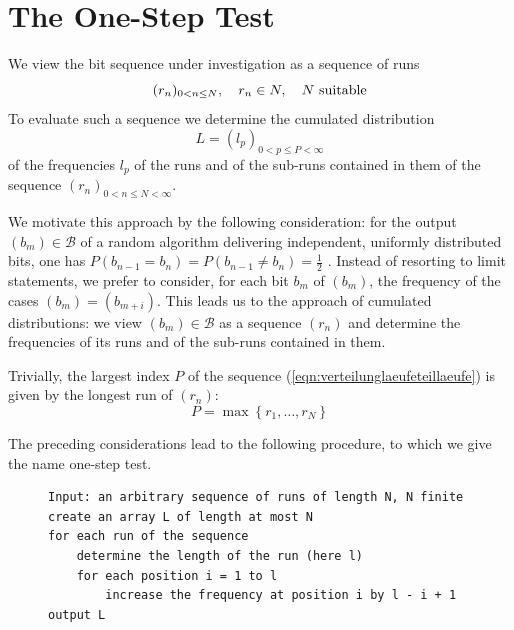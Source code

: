 \documentclass[11pt,a4paper]{scrartcl}
\theoremstyle{plain}
\theoremstyle{definition}
\theoremstyle{remark}
\begin{document}
\section{The One-Step Test}\label{sec:einschritttest}

We view the bit sequence under investigation as a sequence of runs
\begin{equation}\label{eqn:laeuflangefolge}
  (r_n)_{0<n\leq N},\quad r_n\in\mathcal \mathbb N,\quad N\text{ suitable}
\end{equation}
To evaluate such a sequence we determine the cumulated distribution
\begin{equation}\label{eqn:verteilunglaeufeteillaeufe}
  L=(l_p)_{0<p\leq P<\infty}
\end{equation}
of the frequencies $l_p$ of the runs and of the sub-runs contained in
them of the sequence $(r_n)_{0<n\leq N<\infty}$.

We motivate this approach by the following consideration: for the
output $(b_m)\in \mathcal B$ of a random algorithm delivering
independent, uniformly distributed bits, one has
$P(b_{n-1}=b_n)=P(b_{n-1}\neq b_n)=\tfrac{1}{2}$ \cite{feller1968}.
Instead of resorting to limit statements, we prefer to consider, for
each bit $b_m$ of $(b_m)$, the frequency of the cases
$(b_{m})=(b_{m+i})$. This leads us to the approach of cumulated
distributions: we view $(b_m)\in\mathcal B$ as a sequence $(r_n)$ and
determine the frequencies of its runs and of the sub-runs contained
in them.

Trivially, the largest index $P$ of the sequence
(\ref{eqn:verteilunglaeufeteillaeufe}) is given by the longest run of
$(r_n)$:
\begin{equation}\label{eqn:maximalelaengevonl}
  P=\max\left\{ r_1,\dots, r_N\right\}
\end{equation}

\noindent The preceding considerations lead to the following
procedure, to which we give the name one-step test.

\begin{figure}[htbp]
\begin{lstlisting}[caption={One-step test for sequences of runs},label={algo:einschritt-laeufe}]
Input: an arbitrary sequence of runs of length N, N finite
create an array L of length at most N
for each run of the sequence
    determine the length of the run (here l)
    for each position i = 1 to l
        increase the frequency at position i by l - i + 1
output L
\end{lstlisting}
\end{figure}
\end{document}
